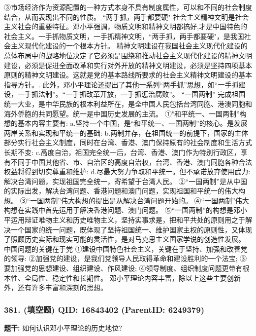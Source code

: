 \documentclass[12pt,UTF8]{ctexart}
\begin{document}
③市场经济作为资源配置的一种方式本身不具有制度属性，可以和不同的社会制度结合，从而表现出不同的性质。
“两手抓，两手都要硬"
社会主义精神文明是社会主义社会的重要特征。邓小平强调，物质文明和精神文明都搞好,才是中国特色的社会主义。一手抓物质文明，一手抓精神文明，“两手抓，两手都要硬"，是我国社会主义现代化建设的一个根本方针。
精神文明建设在我国社会主义现代化建设的总体布局中的战略地位决定了它必须是围绕和推动社会主义现代化建设的精神文明建设，必须是促进全面改革和实行对外开放的精神文明建设，必须是坚持四项基本原则的精神文明建设。这就是党的基本路线所要求的社会主义精神文明建设的基本指导方针。.
此外，邓小平理论还提出了其他一系列“两手抓”思想，如“一手抓建设，一手抓法制”。“一手抓改革开放，一手抓惩治腐败”。
“一国两制”
完成祖国统一大业，是中华民族的根本利益所在，是全中国人民包括台湾同胞、港澳同胞和海外侨胞的共同愿望。统一是中国历史发展的主流。
①"和平统一、一国两制”构想的基本内容主要有:
a.坚持一个中国，是“和平统一、一国两制”的核心。是发展两岸关系和实现和平统一的基础:
b.两制并存，在祖国统一的前提下，国家的主体部分实行社会主义制度，同时在台湾、香港、澳门保持原有的社会制度和生活方式长期不变:
c.高度自治，祖国完全统一后，台湾、香港、澳门作为特别行政区，享有不同于中国其他省、市、自治区的高度自治权，台湾、香港、澳门同胞各种合法权益将得到切实尊重和维护:
d.尽最大努力争取和平统一。但不承诺放弃使用武力:解决台湾问题，实现祖国完全统一，寄希望于台湾人民。
②“一国两制”是从中国的实际出发，解决台湾问题、香港问题和澳门问题，实现祖国和平统一的伟大构想。
③“一国两制”伟大构想的提出是从解决台湾问题开始的。
④“一国两制”伟大构想在实践中首先运用于解决香港问题、澳门问题。
⑤“一国两制”的构想是邓小平运用辩证唯物主义和历史唯物主义，坚持实事求是，把和平共处的原则用之于解决一个国家的统一问题，既体现了坚持祖国统一、维护国家主权的原则性，又体现了照顾历史实际和现实可能的灵活性，是对马克思主义国家学说的创造性发展。
中国问题的关键在于党
①建设中国特色社会主义，关键在于坚持、加强和改善党的领导:
②加强党的建设，是我们党领导人民取得革命和建设胜利的一个法宝;
③要加强党的思想建设、组织建设、作风建设;
④领导制度、组织制度问题更带有根本性、全局性、稳定性和长期性。
邓小平理论内容丰富，除以上这些主要创新外，还有许多丰富和深刻的思想。

\vspace{0.3em}\hrulefill\vspace{0.7em}

\subsubsection*{381. (填空题) \small QID: 16843402 (ParentID: 6249379)}

\textbf{题干:}
如何认识邓小平理论的历史地位?
\end{document}
